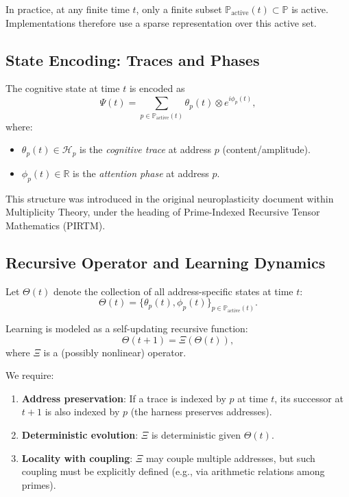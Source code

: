 \documentclass[11pt]{article}
\begin{document}
In practice, at any finite time $t$, only a finite subset $\mathbb{P}_{\mathrm{active}}(t) \subset \mathbb{P}$ is active. Implementations therefore use a sparse representation over this active set.

\subsection{State Encoding: Traces and Phases}

The cognitive state at time $t$ is encoded as
\begin{equation}
\Psi(t) = \sum_{p \in \mathbb{P}_{\mathrm{active}}(t)} \theta_p(t) \otimes e^{i \phi_p(t)},
\end{equation}
where:

\begin{itemize}[noitemsep]
  \item $\theta_p(t) \in \mathcal{H}_p$ is the \emph{cognitive trace} at address $p$ (content/amplitude).
  \item $\phi_p(t) \in \mathbb{R}$ is the \emph{attention phase} at address $p$.
\end{itemize}

This structure was introduced in the original neuroplasticity document within Multiplicity Theory, under the heading of Prime-Indexed Recursive Tensor Mathematics (PIRTM). \cite{neuroplasticityMT}

\subsection{Recursive Operator and Learning Dynamics}

Let $\Theta(t)$ denote the collection of all address-specific states at time $t$:
\[
\Theta(t) = \{\theta_p(t), \phi_p(t)\}_{p \in \mathbb{P}_{\mathrm{active}}(t)}.
\]

Learning is modeled as a self-updating recursive function:
\begin{equation}
\Theta(t+1) = \Xi(\Theta(t)),
\end{equation}
where $\Xi$ is a (possibly nonlinear) operator. \cite{neuroplasticityMT}

We require:

\begin{enumerate}[label=(\alph*),noitemsep]
  \item \textbf{Address preservation}: If a trace is indexed by $p$ at time $t$, its successor at $t+1$ is also indexed by $p$ (the harness preserves addresses).
  \item \textbf{Deterministic evolution}: $\Xi$ is deterministic given $\Theta(t)$.
  \item \textbf{Locality with coupling}: $\Xi$ may couple multiple addresses, but such coupling must be explicitly defined (e.g., via arithmetic relations among primes).
\end{enumerate}
\end{document}

